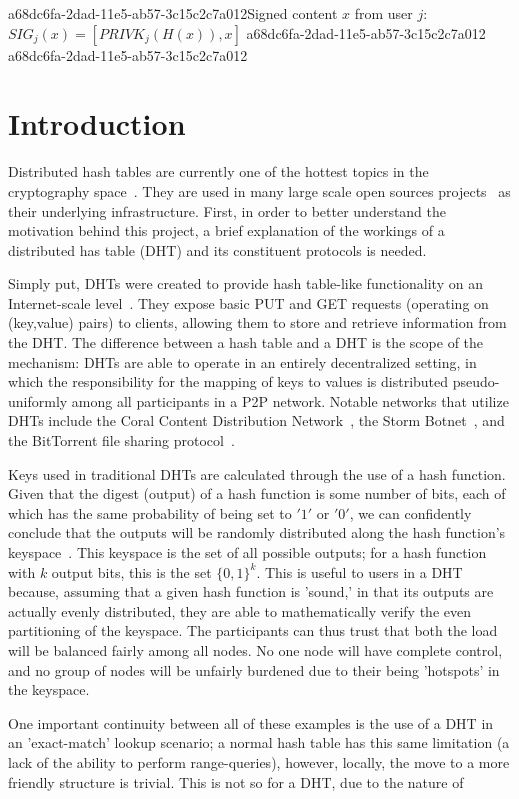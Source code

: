 \documentclass[12pt]{article}
\begin{document}
a68dc6fa-2dad-11e5-ab57-3c15c2c7a012Signed content $x$ from user $j$: $SIG_j(x) = \left[ PRIVK_j( H(x) ), x \right]$
a68dc6fa-2dad-11e5-ab57-3c15c2c7a012
a68dc6fa-2dad-11e5-ab57-3c15c2c7a012\section{Introduction}
\par Distributed hash tables are currently one of the hottest topics in the cryptography space~\cite{Stoica:2001dj,Rowstron:2001ea,Ratnasamy:2001wn}. They are used in many large scale open sources projects~\cite{Freitas:2013tb,Xu:2010vs,Perfitt:2010fh} as their underlying infrastructure. First, in order to better understand the motivation behind this project, a brief explanation of the workings of a distributed has table (DHT) and its constituent protocols is needed.

\par Simply put, DHTs were created to provide hash table-like functionality on an Internet-scale level~\cite{Ratnasamy:2001wn}. They expose basic PUT and GET requests (operating on (key,value) pairs) to clients, allowing them to store and retrieve information from the DHT. The difference between a hash table and a DHT is the scope of the mechanism: DHTs are able to operate in an entirely decentralized setting, in which the responsibility for the mapping of keys to values is distributed pseudo-uniformly among all participants in a P2P network. Notable networks that utilize DHTs include the Coral Content Distribution Network~\cite{Freedman:2004vb}, the Storm Botnet~\cite{Holz:2008uk}, and the BitTorrent file sharing protocol~\cite{Cohen:y1_8mBnw}.

\par Keys used in traditional DHTs are calculated through the use of a hash function. Given that the digest (output) of a hash function is some number of bits, each of which has the same probability of being set to $'1'$ or $'0'$, we can confidently conclude that the outputs will be randomly distributed along the hash function's keyspace~. This keyspace is the set of all possible outputs; for a hash function with $k$ output bits, this is the set $\{0,1\}^k$. This is useful to users in a DHT because, assuming that a given hash function is 'sound,' in that its outputs are actually evenly distributed, they are able to mathematically verify the even partitioning of the keyspace. The participants can thus trust that both the load will be balanced fairly among all nodes. No one node will have complete control, and no group of nodes will be unfairly burdened due to their being 'hotspots' in the keyspace.~

\par One important continuity between all of these examples is the use of a DHT in an 'exact-match' lookup scenario; a normal hash table has this same limitation (a lack of the ability to perform range-queries), however, locally, the move to a more friendly structure is trivial. This is not so for a DHT, due to the nature of
\printbibliography
\end{document}
